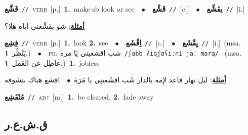\documentclass[10pt,a4paper,twoside]{article} %
\begin{document}
\begin{multicols}{2}
{\setlength\topsep{0pt}\textbf{\foreignlanguage{arabic}{قَشَّع}}\ {\color{gray}\texttt{//}\color{black}}\ \textsc{verb}\ [p.]\ \textbf{1.}~make sb look or see\ \ $\bullet$\ \ \setlength\topsep{0pt}\textbf{\foreignlanguage{arabic}{قَشِّع}}\ {\color{gray}\texttt{//}\color{black}}\ [c.]\ \ $\bullet$\ \ \setlength\topsep{0pt}\textbf{\foreignlanguage{arabic}{يقَشِّع}}\ {\color{gray}\texttt{//}\color{black}}\ [i.]\  \begin{flushright}\color{gray}\foreignlanguage{arabic}{\textbf{\underline{\foreignlanguage{arabic}{أمثلة}}}: شو بقَشِّعني اياه هلا؟}\end{flushright}\color{black}} \vspace{2mm}

{\setlength\topsep{0pt}\textbf{\foreignlanguage{arabic}{قِشِع}}\ {\color{gray}\texttt{//}\color{black}}\ \textsc{verb}\ [p.]\ \textbf{1.}~look  \textbf{2.}~see\ \ $\bullet$\ \ \setlength\topsep{0pt}\textbf{\foreignlanguage{arabic}{اِقْشَع}}\ {\color{gray}\texttt{//}\color{black}}\ [c.]\ \ $\bullet$\ \ \setlength\topsep{0pt}\textbf{\foreignlanguage{arabic}{يِقْشَع}}\ {\color{gray}\texttt{//}\color{black}}\ [i.]\ \color{gray}(msa. \foreignlanguage{arabic}{يَنْظُر}~\foreignlanguage{arabic}{\textbf{١.}})\color{black}\ \ $\bullet$\ \ \textsc{ph.} \color{gray} \foreignlanguage{arabic}{شب اقشعيني يَا مرة}\color{black}\ {\color{gray}\texttt{/{\sffamily ʃabb ʔiqʃaʕiːni jaː mara}/}\color{black}}\ \color{gray} (msa. \foreignlanguage{arabic}{عاطِل عن العَمل}~\foreignlanguage{arabic}{\textbf{١.}})\color{black}\ \textbf{1.}~jobless\  \begin{flushright}\color{gray}\foreignlanguage{arabic}{\textbf{\underline{\foreignlanguage{arabic}{أمثلة}}}: ليل نهار قاعد لإِمه بالدار شَب اقشَعينِي يا مَرَة\ $\bullet$\ \  اقشع هناك بتشوفه}\end{flushright}\color{black}} \vspace{2mm}

{\setlength\topsep{0pt}\textbf{\foreignlanguage{arabic}{مُنْقَشِع}}\ {\color{gray}\texttt{//}\color{black}}\ \textsc{adj}\ [m.]\ \textbf{1.}~be cleared.  \textbf{2.}~fade away\ } \vspace{2mm}

\vspace{-3mm}
\subsection*{\color{blue}\foreignlanguage{arabic}{ق.ش.ع.ر}\color{blue}{}} 


\end{multicols}
\end{document}
